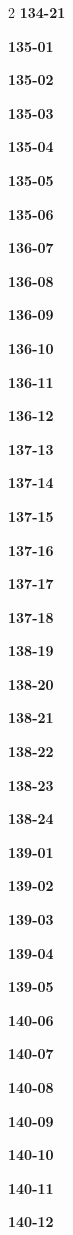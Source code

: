 \documentclass[10pt,a4paper]{article}
\begin{document}
\begin{multicols}{2}
\noindent\textbf{134-21}\ \par
\noindent\textbf{135-01}\ \par
\noindent\textbf{135-02}\ \par
\noindent\textbf{135-03}\ \par
\noindent\textbf{135-04}\ \par
\noindent\textbf{135-05}\ \par
\noindent\textbf{135-06}\ \par
\noindent\textbf{136-07}\ \par
\noindent\textbf{136-08}\ \par
\noindent\textbf{136-09}\ \par
\noindent\textbf{136-10}\ \par
\noindent\textbf{136-11}\ \par
\noindent\textbf{136-12}\ \par
\noindent\textbf{137-13}\ \par
\noindent\textbf{137-14}\ \par
\noindent\textbf{137-15}\ \par
\noindent\textbf{137-16}\ \par
\noindent\textbf{137-17}\ \par
\noindent\textbf{137-18}\ \par
\noindent\textbf{138-19}\ \par
\noindent\textbf{138-20}\ \par
\noindent\textbf{138-21}\ \par
\noindent\textbf{138-22}\ \par
\noindent\textbf{138-23}\ \par
\noindent\textbf{138-24}\ \par
\noindent\textbf{139-01}\ \par
\noindent\textbf{139-02}\ \par
\noindent\textbf{139-03}\ \par
\noindent\textbf{139-04}\ \par
\noindent\textbf{139-05}\ \par
\noindent\textbf{140-06}\ \par
\noindent\textbf{140-07}\ \par
\noindent\textbf{140-08}\ \par
\noindent\textbf{140-09}\ \par
\noindent\textbf{140-10}\ \par
\noindent\textbf{140-11}\ \par
\noindent\textbf{140-12}\ \par

\end{multicols}
\end{document}
